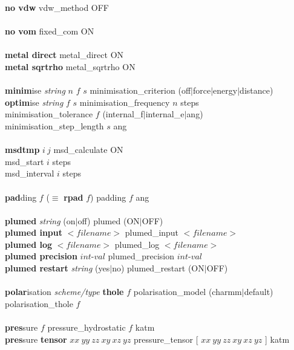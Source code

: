 \begin{tabbing}
\>    {\bf no vdw} \> vdw\_method OFF \\\\
\>    {\bf no vom} \> fixed\_com ON \\\\
\>    {\bf metal direct} \> metal\_direct ON \\
\>    {\bf metal sqrtrho} \> metal\_sqrtrho ON \\\\
\>    {\bf minim}ise {\em string} $n$ $f$ $s$ \> minimisation\_criterion (off$|$force$|$energy$|$distance) \\
\>    {\bf optim}ise {\em string}  $f$ $s$ \> minimisation\_frequency $n$ steps \\
\> \> minimisation\_tolerance $f$ (internal\_f$|$internal\_e$|$ang) \\
\> \> minimisation\_step\_length $s$ ang \\\\
\>    {\bf msdtmp} $i~j$ \> msd\_calculate ON \\
\> \> msd\_start $i$ steps \\
\> \> msd\_interval $i$ steps \\\\
\>    {\bf pad}ding $f$  ($\equiv$ {\bf rpad} $f$) \> padding $f$ ang \\\\
\>    {\bf plumed} {\em string} (on$|$off)         \> plumed (ON$|$OFF) \\
\>    {\bf plumed input} $<$$filename$$>$          \> plumed\_input $<$$filename$$>$ \\
\>    {\bf plumed log} $<$$filename$$>$            \> plumed\_log $<$$filename$$>$ \\
\>    {\bf plumed precision} $int$-$val$           \> plumed\_precision $int$-$val$ \\
\>    {\bf plumed restart} {\em string} (yes$|$no) \> plumed\_restart (ON$|$OFF) \\\\
\>    {\bf polar}isation {\em scheme/type} {\bf thole} $f$ \> \phantom{xxxx} polarisation\_model (charmm$|$default) \\
\> \> polarisation\_thole $f$ \\\\
\>    {\bf pres}sure $f$ \> pressure\_hydrostatic $f$ katm \\
\>    {\bf pres}sure {\bf tensor} $xx~yy~zz~xy~xz~yz$ \> \phantom{xxxx} pressure\_tensor [ $xx~yy~zz~xy~xz~yz$ ] katm \\

\end{tabbing}
